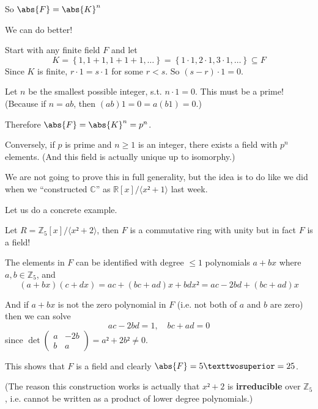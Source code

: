 \documentclass[english]{lbscript}
\begin{document}
So \(\abs{F}=\abs{K}^{n}\)

We can do better!

Start with any finite field \(F\) and let
\begin{equation}
  \label{eq:127}
  K=\left\{ 1, 1+1, 1+1+1, \dots \right\} = \left\{ 1⋅1, 2⋅1, 3⋅1, \dots \right\}  ⊆F
\end{equation}
Since \(K\) is finite, \(r⋅1=s⋅1\) for some \(r<s\). So \((s-r)⋅1=0\).

Let \(n\) be the smallest possible integer, s.t. \(n⋅1=0\). This must be a prime! (Because if \(n=ab\), then \((ab)1=0=a(b1)=0\).)

Therefore \(\abs{F}=\abs{K}^{n}=p^{n}\).

Conversely, if \(p\) is prime and \(n≥1\) is an integer, there exists a field with \(p^{n}\) elements. (And this field is actually unique up to isomorphy.)

We are not going to prove this in full generality, but the idea is to do like we did when we \enquote{constructed \(ℂ\)} as \(ℝ[x]/⟨x²+1⟩\) last week.

Let us do a concrete example.

\begin{example}{}{}
  Let \(R=ℤ_{5}[x]/⟨x²+2⟩\), then \(F\) is a commutative ring with unity but in fact \(F\) is a field!

  The elements in \(F\) can be identified with degree \(≤1\) polynomials \(a+bx\) where \(a,b∈ℤ_{5}\), and
  \begin{equation}
    \label{eq:128}
    (a+bx)(c+dx)=ac + (bc+ad)x + bdx² = ac - 2bd + (bc+ad)x
  \end{equation}

  And if \(a+bx\) is not the zero polynomial in \(F\) (i.e. not both of \(a\) and \(b\) are zero) then we can solve
  \begin{equation}
    \label{eq:129}
    ac-2bd = 1, \quad bc+ad=0
  \end{equation}
  since \(\det \begin{pmatrix} a  & -2b \\ b  & a \end{pmatrix} = a²+2b²≠0 \).

  This shows that \(F\) is a field and clearly \(\abs{F}=5²=25\).

  (The reason this construction works is actually that \(x²+2\) is \textbf{irreducible} over \(ℤ_{5}\), i.e. cannot be written as a product of lower degree polynomials.)
\end{example}
\end{document}
